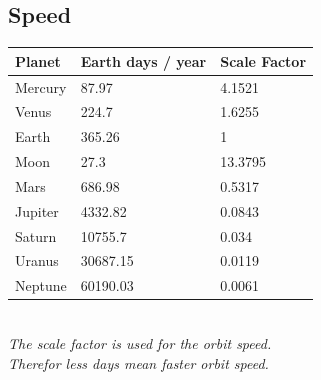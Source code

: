 \subsection{Speed}
\begin{center}
    \begin{tabular}{| l | l | l |}
    \hline
    Planet & Earth days / year & Scale Factor \\ \hline
    Mercury & 87.97 & 4.1521 \\ \hline
    Venus & 224.7 & 1.6255 \\ \hline
    Earth & 365.26 & 1 \\ \hline
    Moon & 27.3 & 13.3795 \\ \hline
    Mars & 686.98 & 0.5317 \\ \hline
    Jupiter & 4332.82 & 0.0843 \\ \hline
    Saturn & 10755.7 & 0.034 \\ \hline
    Uranus & 30687.15 & 0.0119 \\ \hline
    Neptune & 60190.03 & 0.0061 \\
    \hline
    \end{tabular}\\
    \textit{The scale factor is used for the orbit speed.\\
    Therefor less days mean faster orbit speed.}
\end{center}
